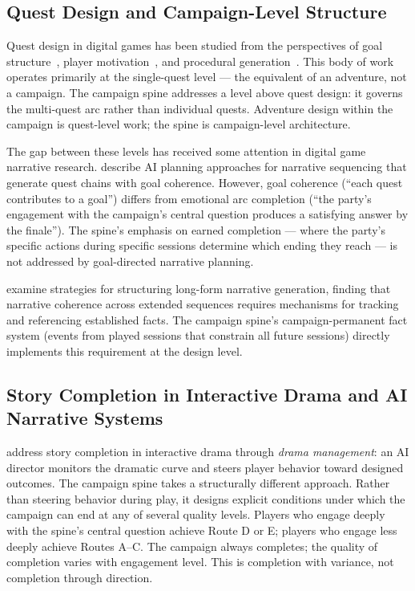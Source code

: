 \subsection{Quest Design and Campaign-Level Structure}

Quest design in digital games has been studied from the perspectives of goal
structure~\cite{dormans2010}, player motivation~\cite{tychsen2006role}, and
procedural generation~\cite{shaker2016procedural}. This body of work operates
primarily at the single-quest level --- the equivalent of an adventure, not a
campaign. The campaign spine addresses a level above quest design: it governs
the multi-quest arc rather than individual quests. Adventure design within the
campaign is quest-level work; the spine is campaign-level architecture.

The gap between these levels has received some attention in digital game narrative
research. \citet{riedl2016} describe AI planning approaches for narrative sequencing
that generate quest chains with goal coherence. However, goal coherence
(``each quest contributes to a goal'') differs from emotional arc completion
(``the party's engagement with the campaign's central question produces a
satisfying answer by the finale''). The spine's emphasis on earned completion ---
where the party's specific actions during specific sessions determine which
ending they reach --- is not addressed by goal-directed narrative planning.

\citet{fan2019} examine strategies for structuring long-form narrative generation,
finding that narrative coherence across extended sequences requires mechanisms
for tracking and referencing established facts. The campaign spine's
campaign-permanent fact system (events from played sessions that constrain all
future sessions) directly implements this requirement at the design level.

\subsection{Story Completion in Interactive Drama and AI Narrative Systems}

\citet{mateas2003faade} address story completion in interactive drama through
\textit{drama management}: an AI director monitors the dramatic curve and steers
player behavior toward designed outcomes. The campaign spine takes a structurally
different approach. Rather than steering behavior during play, it designs explicit
conditions under which the campaign can end at any of several quality levels.
Players who engage deeply with the spine's central question achieve Route D or E;
players who engage less deeply achieve Routes A--C. The campaign always completes;
the quality of completion varies with engagement level. This is completion with
variance, not completion through direction.

